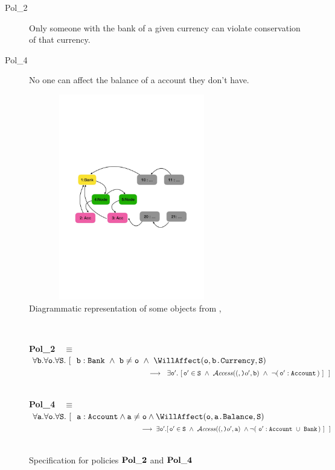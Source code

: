 \documentclass[preprint,10pt]{sigplanconf}
\begin{document}
\begin{description}
\item[Pol\_2]
Only someone with the bank of a given currency can violate conservation of that currency.
 \item[Pol\_4]
No one can affect the balance of a account they don't have.
\end{description}

\begin{figure}[btph]
\includegraphics[width=9cm,height=9cm]{diagram}
 \caption{Diagrammatic representation of some objects from  ,  \etc  }
  \label{fig:Diagram}   
  \end{figure}

\begin{figure}[tbph]
$  $

  {\bf {Pol\_2}}\ \  $\equiv$\ \ $\forall \prg{b}.\forall \prg{o}.\forall \prg{S}.\ [ \ \  \prg{b}:\prg{Bank}\ \wedge\  \prg{b}\neq \prg{o}\ \wedge \ \WillAffect(\prg{o},\prg{b.Currency},\prg{S})  $\\
  $\strut \hspace{6cm}  \longrightarrow \ \ 
  \exists \prg{o}'.\ [\, \prg{o}'\in \prg{S}\ \wedge \  \CanAccess( \prg{o}', \prg{b} )\ \wedge\ \neg (\, \prg{o}' : \prg{Account} \, ) \ ] \  \ ]$

$  $  \\ 

   {\bf {Pol\_4}}\ \  $\equiv$\ \ $\forall \prg{a}.\forall \prg{o}.\forall \prg{S}.\ [ \ \  \prg{a}:\prg{Account} \wedge \prg{a}\neq\prg{o} \wedge \WillAffect(\prg{o},\prg{a.Balance},\prg{S}) \  $\\
$\strut \hspace{6cm} \longrightarrow\  \exists \prg{o}'. [\, \prg{o}'\in \prg{S}\ \wedge \ \CanAccess( \prg{o}', \prg{a} )\ \wedge \neg (\  \prg{o}' : \prg{Account}\ \cup\ \prg{Bank}\, ) \ ] \ \ ]$
\\
$  $  \\ 

  \caption{Specification for policies ${\bf {Pol\_2}}$ and  ${\bf {Pol\_4}}$ }
  \label{fig:Pol2}
  \end{figure}
  
\end{document}
